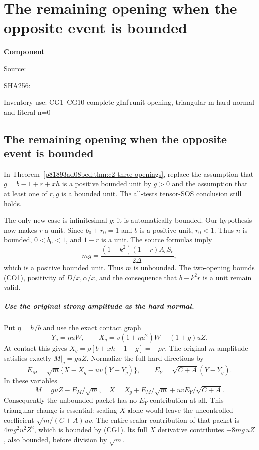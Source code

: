 \chapter{The remaining opening when the opposite event is bounded}
\label{component:pd7bd7f0d7fb6}
\noindent\textbf{Component }\par
{\small\noindent Source: \par}
{\small\noindent SHA256: \par}
{\small\noindent Inventory use: CG1--CG10 complete gInf,runit opening, triangular m hard normal and literal n=0\par}
\medskip
\section{The remaining opening when the opposite event is bounded}
\label{pd7bd7f0d7fb6:sec:c2-last-opening}

\begin{theorem}
\label{pd7bd7f0d7fb6:thm:c2-no-opening-bounds}
In Theorem~\ref{p81893ad08bed:thm:c2-three-openings}, replace the assumption that
$g=b-1+r+xh$ is a positive bounded unit by $g>0$ and the assumption that at least one of $r,g$ is a bounded
unit.  The all-tests tensor-SOS conclusion still holds.
\end{theorem}

The only new case is infinitesimal $g$; it is automatically bounded.
Our hypothesis now makes $r$ a unit.  Since $b_0+r_0=1$ and $b$ is
a positive unit, $r_0<1$.  Thus $n$ is bounded,
$0<b_0<1$, and $1-r$ is a unit.  The source formulas imply
\[
               mg=\frac{(1+k^2)(1-r)A_cS_c}{2\Delta},   \tag{CG1}
\]
which is a positive bounded unit.  Thus $m$ is unbounded.  The
two-opening bounds (CO1), positivity of $D/x,\alpha/x$, and the
consequence that $b-k^2r$ is a unit remain valid.

\paragraph{Use the original strong amplitude as the hard normal.}
Put $\eta=h/b$ and use the exact contact graph
\[
 Y_g=\eta uW,\qquad
 X_g=v(1+\eta u^2)W-(1+g)uZ.                            \tag{CG2}
\]
At contact this gives $X_g=\rho[b+xh-1-g]=-\rho r$.
The original $m$ amplitude satisfies exactly $M|_g=guZ$.
Normalize the full hard directions by
\[
 E_M=\sqrt m\{X-X_g-uv(Y-Y_g)\},\qquad
 E_Y=\sqrt{C+A}(Y-Y_g).                                 \tag{CG3}
\]
In these variables
\[
 M=guZ-E_M/\sqrt m,
 \quad
 X=X_g+E_M/\sqrt m+uvE_Y/\sqrt{C+A}.
\]
Consequently the unbounded packet has no $E_Y$ contribution at all.
This triangular change is essential: scaling $X$ alone would leave
the uncontrolled coefficient $\sqrt{m/(C+A)}uv$.
The entire scalar contribution of that packet is $4mg^2u^2Z^2$,
which is bounded by (CG1).  Its full $X$ derivative contributes
$-8mg\,uZ$, also bounded, before division by $\sqrt m$.

